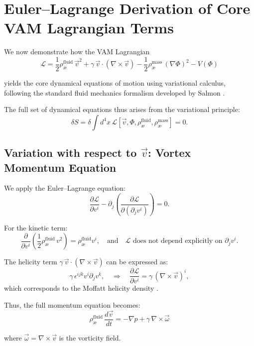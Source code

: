 \section{Euler--Lagrange Derivation of Core VAM Lagrangian Terms}\label{sec:EL-derivation}

We now demonstrate how the VAM Lagrangian
\[
    \mathcal{L} = \frac{1}{2} \rho_\text{\ae}^{\text{fluid}}\, \vec{v}^2 + \gamma\, \vec{v} \cdot (\nabla \times \vec{v}) - \frac{1}{2} \rho_\text{\ae}^{\text{mass}}\, (\nabla \Phi)^2 - V(\Phi)
\]

yields the core dynamical equations of motion using variational calculus, following the standard fluid mechanics formalism developed by Salmon \cite{salmon1988}.

The full set of dynamical equations thus arises from the variational principle:
\[
    \delta S = \delta \int d^4x\, \mathcal{L}[\vec{v}, \Phi, \rho_\text{\ae}^{\text{fluid}}, \rho_\text{\ae}^{\text{mass}}] = 0.
\]


\subsection*{Variation with respect to $\vec{v}$: Vortex Momentum Equation}

We apply the Euler--Lagrange equation:
\[
    \frac{\partial \mathcal{L}}{\partial v^i} - \partial_j \left( \frac{\partial \mathcal{L}}{\partial (\partial_j v^i)} \right) = 0.
\]

For the kinetic term:
\[
  \frac{\partial}{\partial v^i} \left( \frac{1}{2} \rho_\text{\ae}^{\text{fluid}}\, v^2 \right) = \rho_\text{\ae}^{\text{fluid}} v^i,
    \quad \text{and} \quad
    \mathcal{L} \text{ does not depend explicitly on } \partial_j v^i.
\]

The helicity term \( \gamma\, \vec{v} \cdot (\nabla \times \vec{v}) \) can be expressed as:
\[
    \gamma\, \epsilon^{ijk} v^i \partial_j v^k,
    \quad \Rightarrow \quad \frac{\partial \mathcal{L}}{\partial v^i} = \gamma\, (\nabla \times \vec{v})^i,
\]
which corresponds to the Moffatt helicity density \cite{moffatt1969}.

Thus, the full momentum equation becomes:
\begin{equation}
    \boxed{
        \rho_\text{\ae}^{\text{fluid}}\, \frac{d \vec{v}}{dt} = - \nabla p + \gamma\, \nabla \times \vec{\omega}
    }
\end{equation}

where \( \vec{\omega} = \nabla \times \vec{v} \) is the vorticity field.


